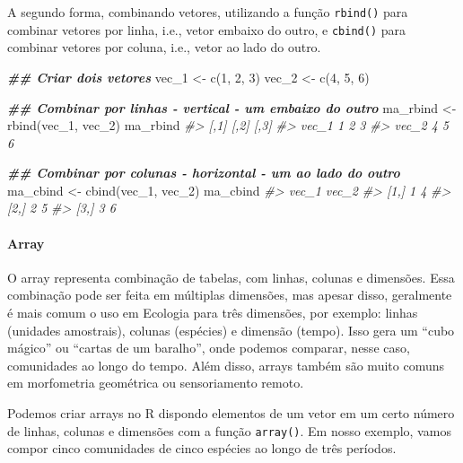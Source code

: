 \documentclass[
]{book}
\newenvironment{Shaded}{\begin{snugshade}}{\end{snugshade}}
\newcommand{\CommentTok}[1]{\textcolor[rgb]{0.37,0.37,0.37}{\textit{#1}}}
\newcommand{\DecValTok}[1]{\textcolor[rgb]{0.06,0.06,0.06}{#1}}
\newcommand{\DocumentationTok}[1]{\textcolor[rgb]{0.37,0.37,0.37}{\textbf{\textit{#1}}}}
\newcommand{\FunctionTok}[1]{\textcolor[rgb]{0,0,0}{#1}}
\newcommand{\NormalTok}[1]{#1}
\newcommand{\OtherTok}[1]{\textcolor[rgb]{0.37,0.37,0.37}{#1}}
\begin{document}
A segundo forma, combinando vetores, utilizando a função \texttt{rbind()} para combinar vetores por linha, i.e., vetor embaixo do outro, e \texttt{cbind()} para combinar vetores por coluna, i.e., vetor ao lado do outro.

\begin{Shaded}
\begin{Highlighting}[]
\DocumentationTok{\#\# Criar dois vetores}
\NormalTok{vec\_1 }\OtherTok{\textless{}{-}} \FunctionTok{c}\NormalTok{(}\DecValTok{1}\NormalTok{, }\DecValTok{2}\NormalTok{, }\DecValTok{3}\NormalTok{)}
\NormalTok{vec\_2 }\OtherTok{\textless{}{-}} \FunctionTok{c}\NormalTok{(}\DecValTok{4}\NormalTok{, }\DecValTok{5}\NormalTok{, }\DecValTok{6}\NormalTok{)}

\DocumentationTok{\#\# Combinar por linhas {-} vertical {-} um embaixo do outro}
\NormalTok{ma\_rbind }\OtherTok{\textless{}{-}} \FunctionTok{rbind}\NormalTok{(vec\_1, vec\_2)}
\NormalTok{ma\_rbind}
\CommentTok{\#\textgreater{}       [,1] [,2] [,3]}
\CommentTok{\#\textgreater{} vec\_1    1    2    3}
\CommentTok{\#\textgreater{} vec\_2    4    5    6}

\DocumentationTok{\#\# Combinar por colunas {-} horizontal {-} um ao lado do outro}
\NormalTok{ma\_cbind }\OtherTok{\textless{}{-}} \FunctionTok{cbind}\NormalTok{(vec\_1, vec\_2)}
\NormalTok{ma\_cbind}
\CommentTok{\#\textgreater{}      vec\_1 vec\_2}
\CommentTok{\#\textgreater{} [1,]     1     4}
\CommentTok{\#\textgreater{} [2,]     2     5}
\CommentTok{\#\textgreater{} [3,]     3     6}
\end{Highlighting}
\end{Shaded}

\hypertarget{array}{%
\paragraph{Array}\label{array}}

O array representa combinação de tabelas, com linhas, colunas e dimensões. Essa combinação pode ser feita em múltiplas dimensões, mas apesar disso, geralmente é mais comum o uso em Ecologia para três dimensões, por exemplo: linhas (unidades amostrais), colunas (espécies) e dimensão (tempo). Isso gera um ``cubo mágico'' ou ``cartas de um baralho'', onde podemos comparar, nesse caso, comunidades ao longo do tempo. Além disso, arrays também são muito comuns em morfometria geométrica ou sensoriamento remoto.

Podemos criar arrays no R dispondo elementos de um vetor em um certo número de linhas, colunas e dimensões com a função \texttt{array()}. Em nosso exemplo, vamos compor cinco comunidades de cinco espécies ao longo de três períodos.
\end{document}
